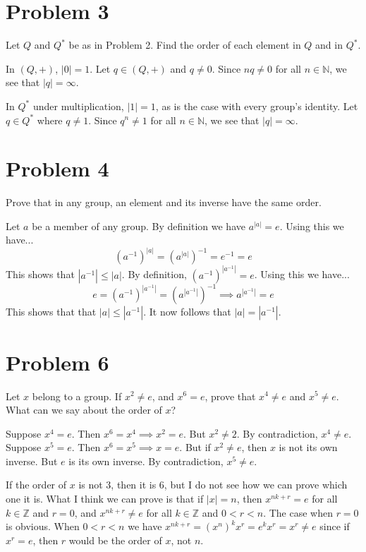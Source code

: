 \documentclass{article}
\begin{document}
\section*{Problem 3}

Let $Q$ and $Q^{*}$ be as in Problem 2.  Find the order of each element in $Q$ and in $Q^{*}$.

In $(Q,+)$, $|0|=1$.  Let $q\in (Q,+)$ and $q\neq 0$.  Since $nq\neq 0$ for all $n\in\mathbb{N}$, we
see that $|q|=\infty$.

In $Q^{*}$ under multiplication, $|1|=1$, as is the case with every group's identity.
Let $q\in Q^{*}$ where $q\neq 1$.  Since $q^n\neq 1$ for all $n\in\mathbb{N}$, we see that
$|q|=\infty$.

\section*{Problem 4}

Prove that in any group, an element and its inverse have the same order.

Let $a$ be a member of any group.  By definition we have $a^{|a|}=e$.
Using this we have...
\begin{equation*}
(a^{-1})^{|a|} = (a^{|a|})^{-1} = e^{-1} = e
\end{equation*}
This shows that $|a^{-1}|\leq|a|$.
By definition, $(a^{-1})^{|a^{-1}|}=e$.  Using this we have...
\begin{equation*}
e = (a^{-1})^{|a^{-1}|} = (a^{|a^{-1}|})^{-1}\implies a^{|a^{-1}|} = e
\end{equation*}
This shows that that $|a|\leq|a^{-1}|$.
It now follows that $|a|=|a^{-1}|$.

\section*{Problem 6}

Let $x$ belong to a group.  If $x^2\neq e$, and $x^6=e$, prove that $x^4\neq e$ and
$x^5\neq e$.  What can we say about the order of $x$?

Suppose $x^4=e$.  Then $x^6=x^4\implies x^2=e$.  But $x^2\neq 2$.  By contradiction, $x^4\neq e$.
Suppose $x^5=e$.  Then $x^6=x^5\implies x=e$.  But if $x^2\neq e$, then $x$ is not its
own inverse.  But $e$ is its own inverse.  By contradiction, $x^5\neq e$.

If the order of $x$ is not 3, then it is 6, but I do not see how we can prove which one it is.
What I think we can prove is that if $|x|=n$, then $x^{nk+r}=e$ for all $k\in\mathbb{Z}$ and $r=0$,
and $x^{nk+r}\neq e$ for all $k\in\mathbb{Z}$ and $0<r<n$.  The case when $r=0$ is obvious.
When $0<r<n$ we have $x^{nk+r}=(x^n)^kx^r = e^kx^r = x^r\neq e$ since if $x^r=e$, then $r$ would
be the order of $x$, not $n$.
\end{document}
